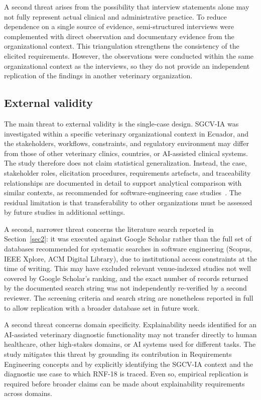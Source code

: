 \documentclass[pdflatex,sn-mathphys-num,Numbered]{sn-jnl}
\begin{document}
A second threat arises from the possibility that interview statements alone may not fully represent actual clinical and administrative practice. To reduce dependence on a single source of evidence, semi-structured interviews were complemented with direct observation and documentary evidence from the organizational context. This triangulation strengthens the consistency of the elicited requirements. However, the observations were conducted within the same organizational context as the interviews, so they do not provide an independent replication of the findings in another veterinary organization.

\subsection{External validity}\label{tv:external}

The main threat to external validity is the single-case design. SGCV-IA was investigated within a specific veterinary organizational context in Ecuador, and the stakeholders, workflows, constraints, and regulatory environment may differ from those of other veterinary clinics, countries, or AI-assisted clinical systems. The study therefore does not claim statistical generalization. Instead, the case, stakeholder roles, elicitation procedures, requirements artefacts, and traceability relationships are documented in detail to support analytical comparison with similar contexts, as recommended for software-engineering case studies~\cite{runeson2009}. The residual limitation is that transferability to other organizations must be assessed by future studies in additional settings.

A second, narrower threat concerns the literature search reported in Section~\ref{sec2}: it was executed against Google Scholar rather than the full set of databases recommended for systematic searches in software engineering (Scopus, IEEE Xplore, ACM Digital Library), due to institutional access constraints at the time of writing. This may have excluded relevant venue-indexed studies not well covered by Google Scholar's ranking, and the exact number of records returned by the documented search string was not independently re-verified by a second reviewer. The screening criteria and search string are nonetheless reported in full to allow replication with a broader database set in future work.

A second threat concerns domain specificity. Explainability needs identified for an AI-assisted veterinary diagnostic functionality may not transfer directly to human healthcare, other high-stakes domains, or AI systems used for different tasks. The study mitigates this threat by grounding its contribution in Requirements Engineering concepts and by explicitly identifying the SGCV-IA context and the diagnostic use case to which RNF-18 is traced. Even so, empirical replication is required before broader claims can be made about explainability requirements across domains.
\end{document}
